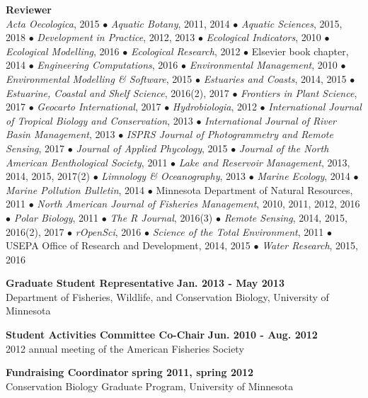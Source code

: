 \documentclass[letterpaper,12pt]{article}
\begin{document}
{\bf Reviewer}\hfill \\
\textit{Acta Oecologica}, 2015 $\bullet$ \textit{Aquatic Botany}, 2011, 2014 $\bullet$ \textit{Aquatic Sciences}, 2015, 2018 $\bullet$ \textit{Development in Practice}, 2012, 2013 $\bullet$ \textit{Ecological Indicators}, 2010 $\bullet$ \textit{Ecological Modelling}, 2016 $\bullet$ \textit{Ecological Research}, 2012 $\bullet$ Elsevier book chapter, 2014 $\bullet$ \textit{Engineering Computations}, 2016 $\bullet$ \textit{Environmental Management}, 2010 $\bullet$ \textit{Environmental Modelling \& Software}, 2015 $\bullet$ \textit{Estuaries and Coasts}, 2014, 2015 $\bullet$ \textit{Estuarine, Coastal and Shelf Science}, 2016(2), 2017 $\bullet$ \textit{Frontiers in Plant Science}, 2017 $\bullet$ \textit{Geocarto International}, 2017 $\bullet$ \textit{Hydrobiologia}, 2012 $\bullet$ \textit{International Journal of Tropical Biology and Conservation}, 2013 $\bullet$ \textit{International Journal of River Basin Management}, 2013 $\bullet$ \textit{ISPRS Journal of Photogrammetry and Remote Sensing}, 2017 $\bullet$ \textit{Journal of Applied Phycology}, 2015 $\bullet$ \textit{Journal of the North American Benthological Society}, 2011 $\bullet$ \textit{Lake and Reservoir Management}, 2013, 2014, 2015, 2017(2) $\bullet$ \textit{Limnology \& Oceanography}, 2013 $\bullet$ \textit{Marine Ecology}, 2014 $\bullet$ \textit{Marine Pollution Bulletin}, 2014 $\bullet$ Minnesota Department of Natural Resources, 2011 $\bullet$ \textit{North American Journal of Fisheries Management}, 2010, 2011, 2012, 2016 $\bullet$ \textit{Polar Biology}, 2011 $\bullet$ \textit{The R Journal}, 2016(3) $\bullet$ \textit{Remote Sensing}, 2014, 2015, 2016(2), 2017 $\bullet$ \textit{rOpenSci}, 2016 $\bullet$ \textit{Science of the Total Environment}, 2011 $\bullet$ USEPA Office of Research and Development, 2014, 2015 $\bullet$ \textit{Water Research}, 2015, 2016

{\bf Graduate Student Representative} \hfill {\bf Jan. 2013 - May 2013} \\
Department of Fisheries, Wildlife, and Conservation Biology, University of Minnesota

{\bf Student Activities Committee Co-Chair} \hfill {\bf Jun. 2010 - Aug. 2012} \\
2012 annual meeting of the American Fisheries Society

{\bf Fundraising Coordinator} \hfill {\bf spring 2011, spring 2012} \\
Conservation Biology Graduate Program, University of Minnesota
\end{document}
